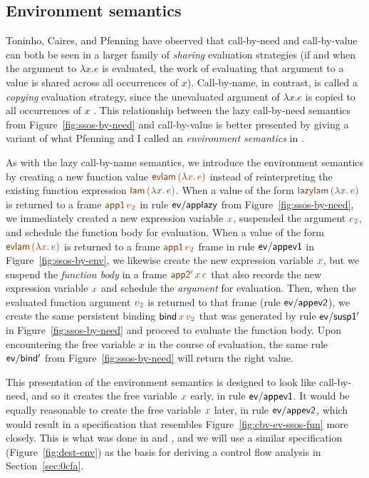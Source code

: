 \subsection{Environment semantics}

Toninho, Caires, and Pfenning have observed that call-by-need and
call-by-value can both be seen in a larger family of {\it sharing}
evaluation strategies (if and when the argument to $\lambda x. e$ is
evaluated, the work of evaluating that argument to a value is shared
across all occurrences of $x$). Call-by-name, in contrast, is called a
{\it copying} evaluation strategy, since the unevaluated argument of
$\lambda x. e$ is copied to all occurrences of $x$
\cite{toninho12functions}. This relationship between the lazy
call-by-need semantics from Figure~\ref{fig:ssos-by-need} and
call-by-value is better presented by giving a variant of what Pfenning
and I called an {\it environment semantics} in
\cite{pfenning09substructural}.


As with the lazy call-by-name semantics, we introduce the environment
semantics by creating a new function value $\lf{{\sf evlam}\,(\lambda
x.\,e)}$ instead of reinterpreting the existing function expression 
$\lf{{\sf
  lam}\,(\lambda x.\,e)}$. When a value of the form $\lf{{\sf
  lazylam}\,(\lambda x.\,e)}$ is returned to a frame 
$\lf{{\sf app1}\,e_2}$
in rule ${\sf ev/applazy}$ from Figure~\ref{fig:ssos-by-need}, we
immediately created a new expression variable $\lf{x}$, suspended the
argument $\lf{e_2}$, and schedule the function body for evaluation. When a
value of the form $\lf{{\sf evlam}\,(\lambda x.\,e)}$ is returned to a
frame $\lf{{\sf app1}\,e_2}$ frame in rule ${\sf ev/appev1}$ in
Figure~\ref{fig:ssos-by-env}, we likewise create the new expression
variable $\lf{x}$, but we suspend the {\it function body} in a frame 
$\lf{{\sf
  app2'}\,x\,e}$ that also records the new expression variable $\lf{x}$ and
schedule the {\it argument} for evaluation. Then, when the evaluated
function argument $\lf{v_2}$ is returned to that frame (rule ${\sf
  ev/appev2}$), we create the same persistent binding ${\sf
  bind}\,\lf{x}\,\lf{v_2}$ that was generated by rule ${\sf ev/susp1'}$ in
Figure~\ref{fig:ssos-by-need} and proceed to evaluate the function
body. Upon encountering the free variable $x$ in the course of
evaluation, the same rule ${\sf ev/bind'}$ from
Figure~\ref{fig:ssos-by-need} will return the right value.

This presentation of the environment semantics is designed to look
like call-by-need, and so it creates the free variable $\lf{x}$ early, in
rule ${\sf ev/appev1}$.  It would be equally reasonable to create the
free variable $\lf{x}$ later, in rule ${\sf ev/appev2}$, which would result
in a specification that resembles
Figure~\ref{fig:cbv-ev-ssos-fun} more closely. This is what
was done in \cite{pfenning09substructural} and
\cite{simmons11logical}, and we will use a similar specification 
(Figure~\ref{fig:dest-env}) as the 
basis for deriving a control flow analysis in Section~\ref{sec:0cfa}.




